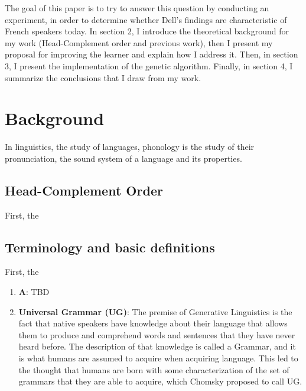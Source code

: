 \documentclass{article}
\begin{document}
The goal of this paper is to try to answer this question by conducting an experiment, in order to determine whether Dell's findings are characteristic of  French speakers today. 
In section 2, I introduce the theoretical background for my work (Head-Complement order and previous work),  then I present my proposal for improving the learner and explain how I address it. 
Then,  in section 3,  I present the implementation of the genetic algorithm. 
Finally,  in section 4,  I summarize the conclusions that I draw from my work.


\clearpage
\section{Background} 
In linguistics, the study of languages, phonology is the study of their pronunciation,  the sound system of a language and its properties.

\subsection{Head-Complement Order} %

First, the 

\subsection{Terminology and basic definitions} %
First, the 
\begin{enumerate}
  \item \textbf{A}: TBD
  \item \textbf{Universal Grammar (UG)}: The premise of Generative Linguistics is the fact that native speakers have knowledge about
their language that allows them to produce and comprehend words and sentences that they have never heard before. The description of that knowledge is called a Grammar, and it is what humans are assumed to acquire when acquiring language. This led to the thought that humans are born with some characterization of the set of grammars that they are able to acquire,  which Chomsky proposed to call UG.
\end{enumerate}
\end{document}
